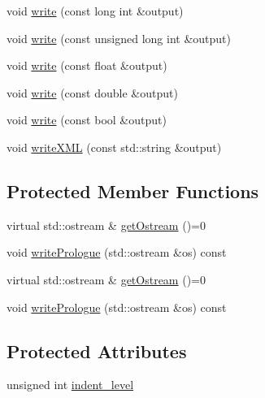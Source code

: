 \begin{DoxyCompactItemize}
\item 
void \mbox{\hyperlink{classXMLWriterAPI_1_1XMLSimpleWriter_a73b030baaf35f5bcb6983de4a133aaf2}{write}} (const long int \&output)
\item 
void \mbox{\hyperlink{classXMLWriterAPI_1_1XMLSimpleWriter_ab905de2de9ab01d4f9d7ae2a5489b19b}{write}} (const unsigned long int \&output)
\item 
void \mbox{\hyperlink{classXMLWriterAPI_1_1XMLSimpleWriter_a0535163fab1b55474edc3e31a52b0c61}{write}} (const float \&output)
\item 
void \mbox{\hyperlink{classXMLWriterAPI_1_1XMLSimpleWriter_a0dc9bdc6334665f7197afbae1139311d}{write}} (const double \&output)
\item 
void \mbox{\hyperlink{classXMLWriterAPI_1_1XMLSimpleWriter_a34886bbfabe67974b8789b070ac27234}{write}} (const bool \&output)
\item 
void \mbox{\hyperlink{classXMLWriterAPI_1_1XMLSimpleWriter_a83601254ff259af02e51d627b4fd4b1b}{write\+X\+ML}} (const std\+::string \&output)
\end{DoxyCompactItemize}
\subsection*{Protected Member Functions}
\begin{DoxyCompactItemize}
\item 
virtual std\+::ostream \& \mbox{\hyperlink{classXMLWriterAPI_1_1XMLSimpleWriter_aaf70b3dcddd7880e838bbc266426dfd5}{get\+Ostream}} ()=0
\item 
void \mbox{\hyperlink{classXMLWriterAPI_1_1XMLSimpleWriter_a09f9ed556d1da6657529363bcee2c61c}{write\+Prologue}} (std\+::ostream \&os) const
\item 
virtual std\+::ostream \& \mbox{\hyperlink{classXMLWriterAPI_1_1XMLSimpleWriter_aaf70b3dcddd7880e838bbc266426dfd5}{get\+Ostream}} ()=0
\item 
void \mbox{\hyperlink{classXMLWriterAPI_1_1XMLSimpleWriter_a1f44b3dd9970ce14e8a4fcf026226028}{write\+Prologue}} (std\+::ostream \&os) const
\end{DoxyCompactItemize}
\subsection*{Protected Attributes}
\begin{DoxyCompactItemize}
\item 
unsigned int \mbox{\hyperlink{classXMLWriterAPI_1_1XMLSimpleWriter_a61ccdacc4406db6a4a78c77a16f150da}{indent\+\_\+level}}
\end{DoxyCompactItemize}


